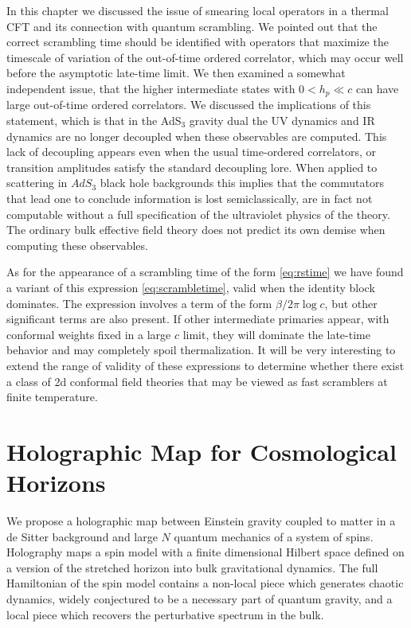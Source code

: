 \documentclass{brownthesis}
\begin{document}
In this chapter we discussed the issue of smearing local operators in
a thermal CFT and its connection with quantum scrambling. We pointed
out that the correct scrambling time should be identified with operators
that maximize the timescale of variation of the out-of-time ordered
correlator, which may occur well before the asymptotic late-time limit.
We then examined a somewhat independent issue, that the higher intermediate
states with $0<h_{p}\ll c$ can have large out-of-time ordered correlators.
We discussed the implications of this statement, which is that in
the AdS$_{3}$ gravity dual the UV dynamics and IR dynamics are no
longer decoupled when these observables are computed. This lack of
decoupling appears even when the usual time-ordered correlators, or
transition amplitudes satisfy the standard decoupling lore. When applied
to scattering in $AdS_{3}$ black hole backgrounds this implies that
the commutators that lead one to conclude information is lost semiclassically,
are in fact not computable without a full specification of the ultraviolet
physics of the theory. The ordinary bulk effective field theory does
not predict its own demise when computing these observables.

As for the appearance of a scrambling time of the form \eqref{eq:rstime}
we have found a variant of this expression \eqref{eq:scrambletime},
valid when the identity block dominates. The expression involves a
term of the form $\beta/2\pi\log c$, but other significant terms
are also present. If other intermediate primaries appear, with conformal
weights fixed in a large $c$ limit, they will dominate the late-time
behavior and may completely spoil thermalization. It will be very
interesting to extend the range of validity of these expressions to
determine whether there exist a class of 2d conformal field theories
that may be viewed as fast scramblers at finite temperature.


\chapter{Holographic Map for Cosmological Horizons}\label{chap:map}
We propose a holographic map between Einstein gravity coupled to matter
in a de Sitter background and large $N$ quantum mechanics of a system
of spins. Holography maps a spin model with a finite dimensional Hilbert
space defined on a version of the stretched horizon into bulk gravitational
dynamics. The full Hamiltonian of the spin model contains a non-local
piece which generates chaotic dynamics, widely conjectured to be a
necessary part of quantum gravity, and a local piece which recovers
the perturbative spectrum in the bulk.
\end{document}

